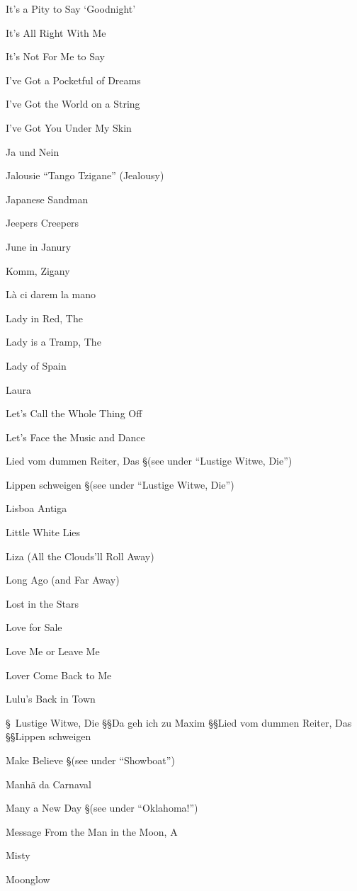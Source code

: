 \N It's a Pity to Say `Goodnight'

\N It's All Right With Me

\N It's Not For Me to Say

\N I've Got a Pocketful of Dreams

\N I've Got the World on a String

\N I've Got You Under My Skin

\N Ja und Nein

\N Jalousie ``Tango Tzigane'' (Jealousy)

\N Japanese Sandman

\N Jeepers Creepers

\N June in Janury

\N Komm, Zigany

\N L{\`a} ci darem la mano

\N Lady in Red, The

\N Lady is a Tramp, The

\N Lady of Spain

\N Laura

\N Let's Call the Whole Thing Off

\N Let's Face the Music and Dance

\N Lied vom dummen Reiter, Das
\nobreak
\S (see under ``Lustige Witwe, Die'')

\N Lippen schweigen
\nobreak
\S (see under ``Lustige Witwe, Die'')

\N Lisboa Antiga

\N Little White Lies

\N Liza (All the Clouds'll Roll Away)

\N Long Ago (and Far Away)

\N Lost in the Stars

\N Love for Sale

\N Love Me or Leave Me

\N Lover Come Back to Me

\N Lulu's Back in Town

\S\ Lustige Witwe, Die
\S\S Da geh ich zu Maxim
\S\S Lied vom dummen Reiter, Das
\S\S Lippen schweigen

\N Make Believe
\nobreak
\S (see under ``Showboat'')

\N Manh{\~a} da Carnaval

\N Many a New Day
\nobreak
\S (see under ``Oklahoma!'')

\N Message From the Man in the Moon, A

\N Misty

\N Moonglow

